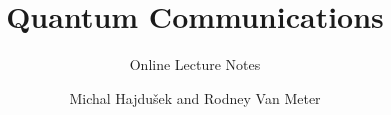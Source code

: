 \documentclass[6x9]{newmath}
\title{Quantum Communications}
\subtitle{Online Lecture Notes}
\author{Michal Hajdu\v{s}ek and Rodney Van Meter}
\begin{document}
\halftitlepage


\titlepage

\begin{copyrightpage}
\doclicenseThis%

\end{copyrightpage}

\dedication{For my sisters, who make the world a better place\\
---rdv\\
\newline
\newline
For my wife and children, my three deterministic sources of bright light\\
---michal}



\tableofcontents
\listoffigures
\end{document}
